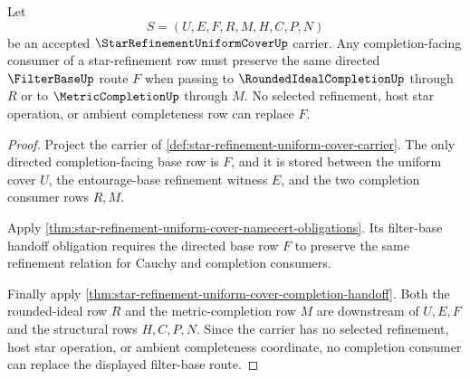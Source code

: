\begin{theorem}
\label{thm:star-refinement-completion-filter-route}
Let
$$
S=(U,E,F,R,M,H,C,P,N)
$$
be an accepted $\StarRefinementUniformCoverUp$ carrier. Any completion-facing
consumer of a star-refinement row must preserve the same directed
$\FilterBaseUp$ route $F$ when passing to $\RoundedIdealCompletionUp$ through
$R$ or to $\MetricCompletionUp$ through $M$. No selected refinement, host star
operation, or ambient completeness row can replace $F$.
\end{theorem}
\begin{proof}
Project the carrier of
\autoref{def:star-refinement-uniform-cover-carrier}. The only directed
completion-facing base row is $F$, and it is stored between the uniform cover
$U$, the entourage-base refinement witness $E$, and the two completion
consumer rows $R,M$.

Apply \autoref{thm:star-refinement-uniform-cover-namecert-obligations}. Its
filter-base handoff obligation requires the directed base row $F$ to preserve
the same refinement relation for Cauchy and completion consumers.

Finally apply
\autoref{thm:star-refinement-uniform-cover-completion-handoff}. Both the
rounded-ideal row $R$ and the metric-completion row $M$ are downstream of
$U,E,F$ and the structural rows $H,C,P,N$. Since the carrier has no selected
refinement, host star operation, or ambient completeness coordinate, no
completion consumer can replace the displayed filter-base route.
\end{proof}


\begin{closurestatus}{\StarRefinementUniformCoverUp}
  \theoryclosure{\seedClosure}
  \formalstatus{\unformalizedV}
\end{closurestatus}
